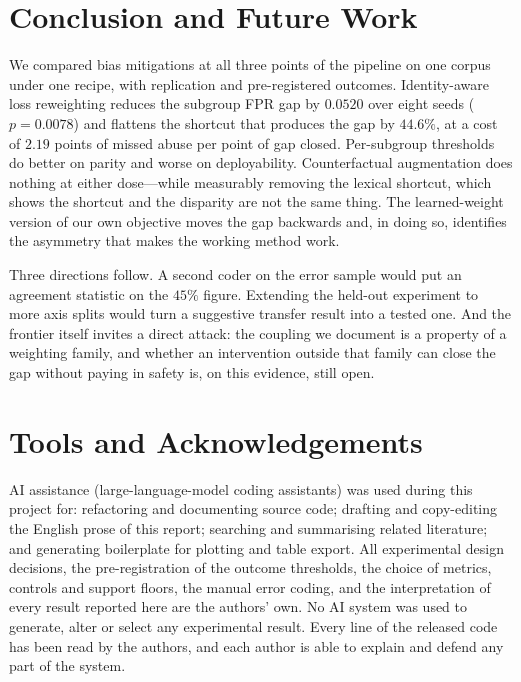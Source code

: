 \documentclass[conference]{IEEEtran}
\begin{document}
\section{Conclusion and Future Work}

We compared bias mitigations at all three points of the pipeline on one corpus
under one recipe, with replication and pre-registered outcomes. Identity-aware
loss reweighting reduces the subgroup FPR gap by $0.0520$ over eight seeds
($p = 0.0078$) and flattens the shortcut that produces the gap by $44.6\%$, at a
cost of $2.19$ points of missed abuse per point of gap closed. Per-subgroup
thresholds do better on parity and worse on deployability. Counterfactual
augmentation does nothing at either dose---while measurably removing the lexical
shortcut, which shows the shortcut and the disparity are not the same thing. The
learned-weight version of our own objective moves the gap backwards and, in
doing so, identifies the asymmetry that makes the working method work.

Three directions follow. A second coder on the error sample would put an
agreement statistic on the $45\%$ figure. Extending the held-out experiment to
more axis splits would turn a suggestive transfer result into a tested one. And
the frontier itself invites a direct attack: the coupling we document is a
property of a weighting family, and whether an intervention outside that family
can close the gap without paying in safety is, on this evidence, still open.

\section*{Tools and Acknowledgements}

AI assistance (large-language-model coding assistants) was used during this
project for: refactoring and documenting source code; drafting and copy-editing
the English prose of this report; searching and summarising related literature;
and generating boilerplate for plotting and table export. All experimental design
decisions, the pre-registration of the outcome thresholds, the choice of metrics,
controls and support floors, the manual error coding, and the interpretation of
every result reported here are the authors' own. No AI system was used to
generate, alter or select any experimental result. Every line of the released
code has been read by the authors, and each author is able to explain and defend
any part of the system.
\end{document}
